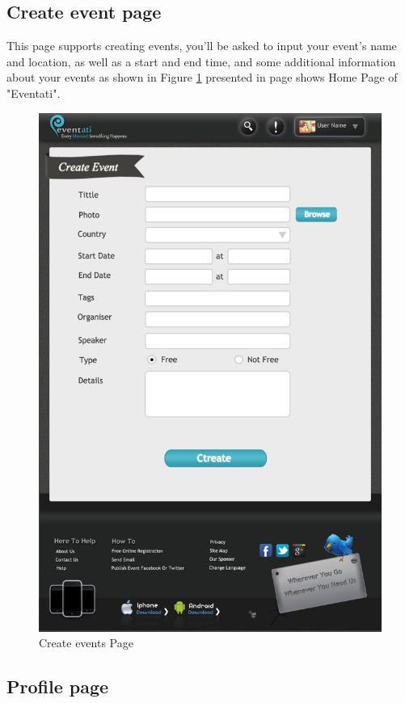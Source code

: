 \documentclass[12pt,a4paper,class,twoside,openany]{report}
\begin{document}
{\subsection{Create event page}
This page supports creating events, you'll be asked to input your event's name and location, as well as a start and end time, and some additional information about your events as shown in Figure \ref{fg:6-10} presented in page \pageref{fg:6-10} shows Home Page of "Eventati".
\begin{figure}
\begin{center}
\includegraphics[height=8.10 in]{6-10}
\caption{Create events Page}
\label{fg:6-10}
\end{center}
\end{figure}
\subsection{Profile page }
}
\end{document}
